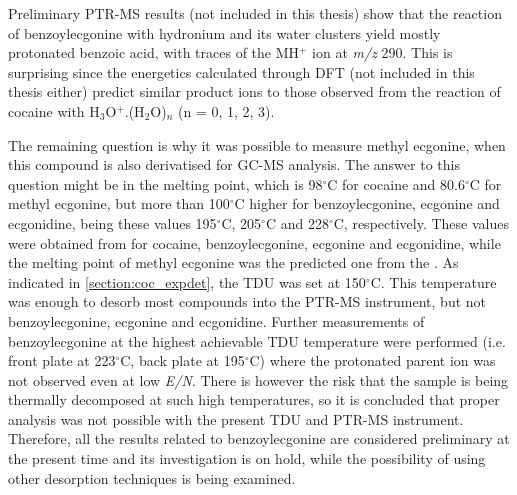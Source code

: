 Preliminary PTR-MS results (not included in this thesis) show that the reaction of benzoylecgonine with hydronium and its water clusters yield mostly protonated benzoic acid, with traces of the MH$^+$ ion at \textit{m/z} 290.
%
This is surprising since the energetics calculated through DFT (not included in this thesis either) predict similar product ions to those observed from the reaction of cocaine with H$_3$O$^+$.(H$_2$O)$_n$ (n = 0, 1, 2, 3).
%






The remaining question  is why it was possible to measure methyl ecgonine, when this compound is also derivatised for GC-MS analysis.
%
The answer to this question might be in the melting point, which is 98$^{\circ}$C for cocaine and 80.6$^{\circ}$C for methyl ecgonine, but more than 100$^{\circ}$C higher for benzoylecgonine, ecgonine and ecgonidine, being these values 195$^{\circ}$C, 205$^{\circ}$C and 228$^{\circ}$C, respectively.
%
These values were obtained from \citeauthor{haynes2014crc} for cocaine, benzoylecgonine, ecgonine and ecgonidine, while the melting point of methyl ecgonine was the predicted one from the \citeauthor{USAEPA} \cite{haynes2014crc,USAEPA}.
%
As indicated in \autoref{section:coc_expdet}, the TDU was set at 150$^{\circ}$C. This temperature was enough to desorb most compounds into the PTR-MS instrument, but not benzoylecgonine, ecgonine and ecgonidine.
%
Further measurements of benzoylecgonine at the highest achievable TDU temperature were performed (i.e. front plate at 223$^{\circ}$C, back plate at 195$^{\circ}$C) %
where the protonated parent ion was not observed even at low \textit{E/N}.
%
There is however the risk that the sample is being thermally decomposed at such high temperatures, so it is concluded that proper analysis was not possible with the present TDU and PTR-MS instrument.
%
Therefore, all the results related to benzoylecgonine are considered preliminary at the present time  and its investigation is on hold, while the possibility of using other desorption techniques %
is being examined.
















